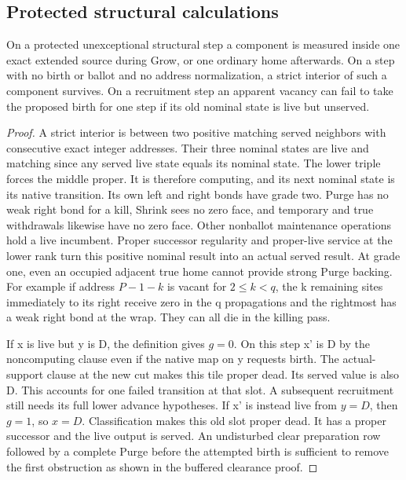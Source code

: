 \subsection{Protected structural calculations}
\begin{lemma}\label{lem:transition}
On a protected unexceptional structural step a component is measured inside one exact extended source during Grow, or one ordinary home afterwards. On a step with no birth or ballot and no address normalization, a strict interior of such a component survives. On a recruitment step an apparent vacancy can fail to take the proposed birth for one step if its old nominal state is live but unserved.
\end{lemma}
\begin{proof}


A strict interior is between two positive matching served neighbors with consecutive exact integer addresses. Their three nominal states are live and matching since any served live state equals its nominal state. The lower triple forces the middle proper. It is therefore computing, and its next nominal state is its native transition. Its own left and right bonds have grade two. Purge has no weak right bond for a kill, Shrink sees no zero face, and temporary and true withdrawals likewise have no zero face. Other nonballot maintenance operations hold a live incumbent. Proper successor regularity and proper-live service at the lower rank turn this positive nominal result into an actual served result. At grade one, even an occupied adjacent true home cannot provide strong Purge backing. For example if address \(P- 1- k\) is vacant for \(2\le k<q\), the k remaining sites immediately to its right receive zero in the q propagations and the rightmost has a weak right bond at the wrap. They can all die in the killing pass.

If x is live but y is D, the definition gives \(g=0\). On this step x' is D by the noncomputing clause even if the native map on y requests birth. The actual-support clause at the new cut makes this tile proper dead. Its served value is also D. This accounts for one failed transition at that slot. A subsequent recruitment still needs its full lower advance hypotheses. If x' is instead live from \(y=D\), then \(g=1\), so \(x=D\). Classification makes this old slot proper dead. It has a proper successor and the live output is served. An undisturbed clear preparation row followed by a complete Purge before the attempted birth is sufficient to remove the first obstruction as shown in the buffered clearance proof.


\end{proof}
